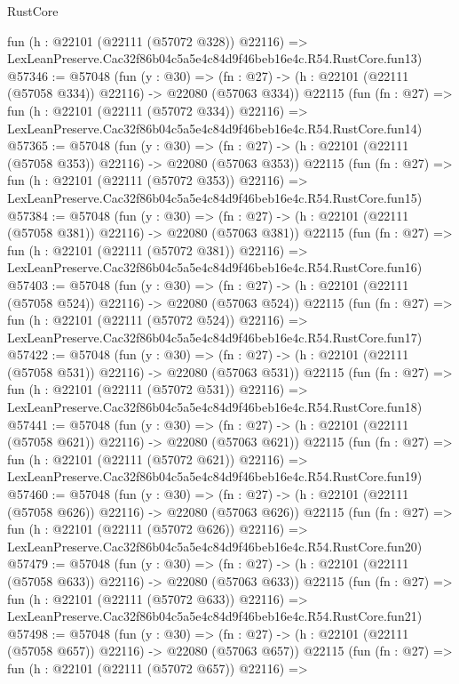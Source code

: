 \begin{lexlean}{RustCore}
\begin{coremodule}
    fun (h : @22101 (@22111 (@57072 @328)) @22116) =>
    LexLeanPreserve.Cac32f86b04c5a5e4c84d9f46beb16e4c.R54.RustCore.fun13)
@57346 := @57048
    (fun (y : @30) =>
    (fn : @27) -> (h : @22101 (@22111 (@57058 @334)) @22116) -> @22080 (@57063 @334))
    @22115
    (fun (fn : @27) =>
    fun (h : @22101 (@22111 (@57072 @334)) @22116) =>
    LexLeanPreserve.Cac32f86b04c5a5e4c84d9f46beb16e4c.R54.RustCore.fun14)
@57365 := @57048
    (fun (y : @30) =>
    (fn : @27) -> (h : @22101 (@22111 (@57058 @353)) @22116) -> @22080 (@57063 @353))
    @22115
    (fun (fn : @27) =>
    fun (h : @22101 (@22111 (@57072 @353)) @22116) =>
    LexLeanPreserve.Cac32f86b04c5a5e4c84d9f46beb16e4c.R54.RustCore.fun15)
@57384 := @57048
    (fun (y : @30) =>
    (fn : @27) -> (h : @22101 (@22111 (@57058 @381)) @22116) -> @22080 (@57063 @381))
    @22115
    (fun (fn : @27) =>
    fun (h : @22101 (@22111 (@57072 @381)) @22116) =>
    LexLeanPreserve.Cac32f86b04c5a5e4c84d9f46beb16e4c.R54.RustCore.fun16)
@57403 := @57048
    (fun (y : @30) =>
    (fn : @27) -> (h : @22101 (@22111 (@57058 @524)) @22116) -> @22080 (@57063 @524))
    @22115
    (fun (fn : @27) =>
    fun (h : @22101 (@22111 (@57072 @524)) @22116) =>
    LexLeanPreserve.Cac32f86b04c5a5e4c84d9f46beb16e4c.R54.RustCore.fun17)
@57422 := @57048
    (fun (y : @30) =>
    (fn : @27) -> (h : @22101 (@22111 (@57058 @531)) @22116) -> @22080 (@57063 @531))
    @22115
    (fun (fn : @27) =>
    fun (h : @22101 (@22111 (@57072 @531)) @22116) =>
    LexLeanPreserve.Cac32f86b04c5a5e4c84d9f46beb16e4c.R54.RustCore.fun18)
@57441 := @57048
    (fun (y : @30) =>
    (fn : @27) -> (h : @22101 (@22111 (@57058 @621)) @22116) -> @22080 (@57063 @621))
    @22115
    (fun (fn : @27) =>
    fun (h : @22101 (@22111 (@57072 @621)) @22116) =>
    LexLeanPreserve.Cac32f86b04c5a5e4c84d9f46beb16e4c.R54.RustCore.fun19)
@57460 := @57048
    (fun (y : @30) =>
    (fn : @27) -> (h : @22101 (@22111 (@57058 @626)) @22116) -> @22080 (@57063 @626))
    @22115
    (fun (fn : @27) =>
    fun (h : @22101 (@22111 (@57072 @626)) @22116) =>
    LexLeanPreserve.Cac32f86b04c5a5e4c84d9f46beb16e4c.R54.RustCore.fun20)
@57479 := @57048
    (fun (y : @30) =>
    (fn : @27) -> (h : @22101 (@22111 (@57058 @633)) @22116) -> @22080 (@57063 @633))
    @22115
    (fun (fn : @27) =>
    fun (h : @22101 (@22111 (@57072 @633)) @22116) =>
    LexLeanPreserve.Cac32f86b04c5a5e4c84d9f46beb16e4c.R54.RustCore.fun21)
@57498 := @57048
    (fun (y : @30) =>
    (fn : @27) -> (h : @22101 (@22111 (@57058 @657)) @22116) -> @22080 (@57063 @657))
    @22115
    (fun (fn : @27) =>
    fun (h : @22101 (@22111 (@57072 @657)) @22116) =>

\end{coremodule}
\end{lexlean}
